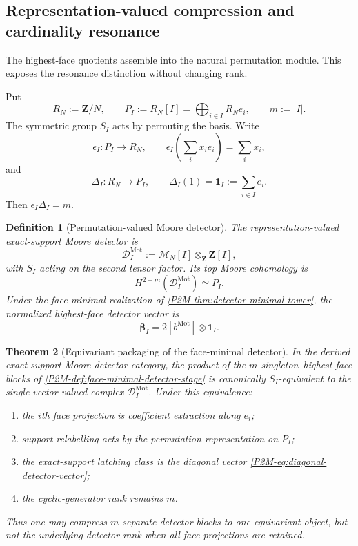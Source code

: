 \documentclass[11pt]{article}
\newtheorem{theorem}{Theorem}[section]
\newtheorem{definition}[theorem]{Definition}
\theoremstyle{remark}
\newcommand{\Z}{\mathbf Z}
\newcommand{\Mot}{\mathrm{Mot}}
\begin{document}
\subsection{Representation-valued compression and cardinality resonance}

The highest-face quotients assemble into the natural permutation module.
This exposes the resonance distinction without changing rank.

Put
\[
 R_N:=\Z/N,
 \qquad
 P_I:=R_N[I]=\bigoplus_{i\in I}R_N e_i,
 \qquad m:=|I|.
\]
The symmetric group $S_I$ acts by permuting the basis.  Write
\begin{equation}
 \epsilon_I:P_I\longrightarrow R_N,
 \qquad
 \epsilon_I\!\left(\sum_i x_ie_i\right)=\sum_i x_i,
\end{equation}
and
\begin{equation}
 \Delta_I:R_N\longrightarrow P_I,
 \qquad
 \Delta_I(1)=\mathbf 1_I:=\sum_{i\in I}e_i.
\end{equation}
Then $\epsilon_I\Delta_I=m$.

\begin{definition}[Permutation-valued Moore detector]
\label{P2M-def:permutation-valued-moore-detector}
The representation-valued exact-support Moore detector is
\begin{equation}
 \boxed{
 \mathcal D_I^{\Mot}
 :=\mathcal M_N[I]\otimes_{\Z}\Z[I],}
\end{equation}
with $S_I$ acting on the second tensor factor.  Its top Moore cohomology is
\[
 H^{2-m}(\mathcal D_I^{\Mot})\simeq P_I.
\]
Under the face-minimal realization of
\cref{P2M-thm:detector-minimal-tower}, the normalized highest-face detector vector
is
\begin{equation}\label{P2M-eq:diagonal-detector-vector}
 \boxed{
 \boldsymbol\beta_I
 =2[b^{\Mot}]\otimes\mathbf 1_I.}
\end{equation}
\end{definition}

\begin{theorem}[Equivariant packaging of the face-minimal detector]
\label{P2M-thm:equivariant-face-packaging}
In the derived exact-support Moore detector category, the product of the
$m$ singleton--highest-face blocks of
\cref{P2M-def:face-minimal-detector-stage} is canonically $S_I$-equivalent to the
single vector-valued complex $\mathcal D_I^{\Mot}$.  Under this equivalence:
\begin{enumerate}[label=\textup{(\roman*)}]
\item the $i$th face projection is coefficient extraction along $e_i$;
\item support relabelling acts by the permutation representation on $P_I$;
\item the exact-support latching class is the diagonal vector
      \eqref{P2M-eq:diagonal-detector-vector};
\item the cyclic-generator rank remains $m$.
\end{enumerate}
Thus one may compress $m$ separate detector \emph{blocks} to one equivariant
object, but not the underlying detector rank when all face projections are
retained.
\end{theorem}
\end{document}
